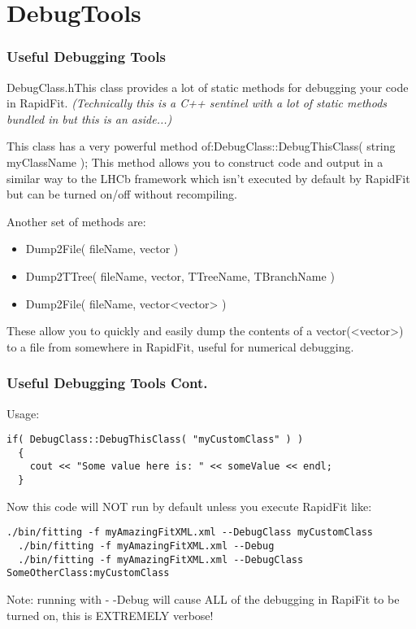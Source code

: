 \documentclass{beamer}
\begin{document}
\section{DebugTools}

\begin{frame}[fragile]
\frametitle{Useful Debugging Tools}
\footnotesize
\textrm{DebugClass.h}\newline This class provides a lot of static methods for debugging your code in RapidFit.\newline
\tiny\textit{(Technically this is a C++ sentinel with a lot of static methods bundled in but this is an aside...)}\newline\footnotesize

This class has a very powerful method of:\newline \textrm{DebugClass::DebugThisClass( string myClassName );}\newline
This method allows you to construct code and output in a similar way to the LHCb framework which isn't executed by default by RapidFit but can be turned on/off without recompiling.\newline

Another set of methods are:
\begin{itemize}
  \item Dump2File( fileName, vector )
  \item Dump2TTree( fileName, vector, TTreeName, TBranchName )
  \item Dump2File( fileName, vector<vector> )
\end{itemize}
These allow you to quickly and easily dump the contents of a vector(<vector>) to a file from somewhere in RapidFit, useful for numerical debugging.

\end{frame}

\begin{frame}[fragile]
\frametitle{Useful Debugging Tools Cont.}
\footnotesize
Usage:\newline
\lstset{
  language=C++
}
\begin{lstlisting}[tabsize=8]
  if( DebugClass::DebugThisClass( "myCustomClass" ) )
  {
    cout << "Some value here is: " << someValue << endl;
  }
\end{lstlisting}

Now this code will NOT run by default unless you execute RapidFit like:\newline
\tiny\lstset{
  language=C++
}
\begin{lstlisting}[tabsize=8]
  ./bin/fitting -f myAmazingFitXML.xml --DebugClass myCustomClass
  ./bin/fitting -f myAmazingFitXML.xml --Debug
  ./bin/fitting -f myAmazingFitXML.xml --DebugClass SomeOtherClass:myCustomClass
\end{lstlisting}\footnotesize

Note: running with \textrm{- -Debug} will cause ALL of the debugging in RapiFit to be turned on, this is EXTREMELY verbose!

\end{frame}
\end{document}

